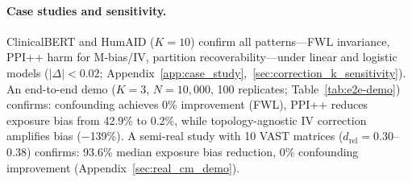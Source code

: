 \paragraph{Case studies and sensitivity.}
ClinicalBERT and HumAID ($K{=}10$) confirm all patterns---FWL invariance, PPI++ harm for M-bias/IV, partition recoverability---under linear and logistic models ($|\Delta| < 0.02$; Appendix~\ref{app:case_study},~\ref{sec:correction_k_sensitivity}). An end-to-end demo ($K{=}3$, $N{=}10{,}000$, 100 replicates; Table~\ref{tab:e2e-demo}) confirms: confounding achieves 0\% improvement (FWL), PPI++ reduces exposure bias from 42.9\% to 0.2\%, while topology-agnostic IV correction amplifies bias ($-$139\%). A semi-real study with 10 VAST matrices ($d_{\mathrm{rel}} = 0.30$--$0.38$) confirms: 93.6\% median exposure bias reduction, 0\% confounding improvement (Appendix~\ref{sec:real_cm_demo}).
